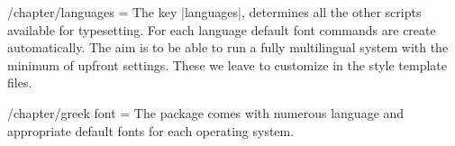\begin{key}{/chapter/languages = }  
The key |languages|, determines all the other scripts available for typesetting. For each language default font commands are create automatically. The aim is to be able to run a fully multilingual system with the minimum of upfront settings. These we leave to customize in the style template files.
\end{key}

\begin{key}{/chapter/greek font = }  
The package comes with numerous language and appropriate default fonts
for each operating system. 
\end{key}










